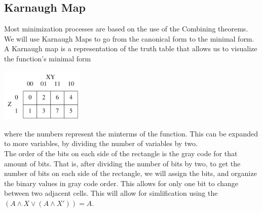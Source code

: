 \documentclass[nobib]{tufte-handout}
\begin{document}
\subsection{Karnaugh Map}
Most minimization processes are based on the use of the Combining theorems.\\
We will use Karnaugh Maps to go from the canonical form to the minimal form. A
Karnaugh map is a representation of the truth table that allows us to visualize
the function's minimal form
\begin{center}
    \includegraphics[width = 150px]{images/karnaugh.png}
\end{center}
where the numbers represent the minterms of the function. This can be expanded to more variables, by dividing the number of variables by two.\\
The order of the bits on each side of the rectangle is the gray code for that amount of bits. That is, after dividing the number of bits by two, to get the number of bits on each side of the rectangle, we will assign the bits, and organize the binary values in gray code order. This allows for only one bit to change between two adjacent cells. This will allow for simlification using the $(A\land X\lor(A\land X')) = A$.\\
\end{document}
